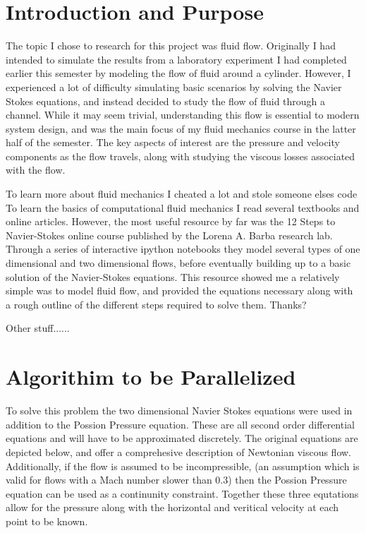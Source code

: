 \documentclass[12pt]{article}
\begin{document}
\maketitle

\section{Introduction and Purpose}
The topic I chose to research for this project was fluid flow. Originally I had intended to simulate the results
from a laboratory experiment I had completed earlier this semester by modeling the flow of fluid around a cylinder. 
However, I experienced a lot of difficulty simulating basic scenarios by solving the Navier Stokes equations, and 
instead decided to study the flow of fluid through a channel. While it may seem trivial, understanding this flow is 
essential to modern system design, and was the main focus of my fluid mechanics course in the latter half of the 
semester. The key aspects of interest are the pressure and velocity components as the flow travels, along with 
studying the viscous losses associated with the flow. 

To learn more about fluid mechanics I cheated a lot and stole someone elses code
To learn the basics of computational fluid mechanics I read several textbooks and online articles. However, the most 
useful resource by far was the 12 Steps to Navier-Stokes online course published by the Lorena A. Barba research lab. 
Through a series of interactive ipython notebooks they model several types of one dimensional and two dimensional 
flows, before eventually building up to a basic solution of the Navier-Stokes equations. This resource showed me a 
relatively simple was to model fluid flow, and provided the equations necessary along with a rough outline of the 
different steps required to solve them.
Thanks?


Other stuff......


\section{Algorithim to be Parallelized}
To solve this problem the two dimensional Navier Stokes equations were used in addition to the Possion Pressure 
equation. These are all second order differential equations and will have to be approximated discretely. The original 
equations are depicted below, and offer a comprehesive description of Newtonian viscous flow. Additionally, if the 
flow is assumed to be incompressible, (an assumption which is valid for flows with a Mach number slower than 0.3) then 
the Possion Pressure equation can be used as a continunity constraint. Together these three equtations allow for the 
pressure along with the  horizontal and veritical velocity at each point to be known.
\end{document}
